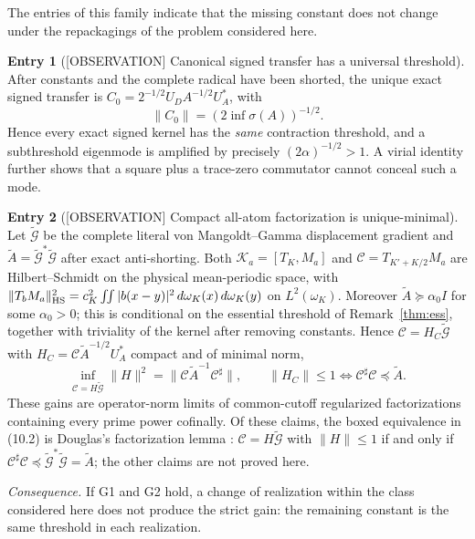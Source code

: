 \documentclass[11pt]{amsart}
\theoremstyle{definition}
\newcounter{family}
\newtheorem{entry}{Entry}[family]
\theoremstyle{remark}
\newcommand{\dd}{\,d}
\newcommand{\OBS}{\textup{[OBSERVATION]}}
\begin{document}
The entries of this family indicate that the missing constant does not
change under the repackagings of the problem considered here.

\begin{entry}[\OBS{} Canonical signed transfer has a universal threshold]
\label{ent:G1}
After constants and the complete radical have been shorted, the unique
exact signed transfer is
\(C_0=2^{-1/2}U_DA^{-1/2}U_A^*\), with
\[
 \boxed{\|C_0\|=(2\inf\sigma(A))^{-1/2}.}
\tag{10.1}
\]
Hence every exact signed kernel has the \emph{same} contraction threshold,
and a subthreshold eigenmode is amplified by precisely
\((2\alpha)^{-1/2}>1\).  A virial identity further shows that a square
plus a trace-zero commutator cannot conceal such a mode.
\end{entry}

\begin{entry}[\OBS{} Compact all-atom factorization is unique-minimal]
\label{ent:G2}
Let \(\widetilde{\mathcal G}\) be the complete literal von
Mangoldt--Gamma displacement gradient and
\(\widetilde A=\widetilde{\mathcal G}^*\widetilde{\mathcal G}\) after exact
anti-shorting.  Both \(\mathcal K_a=[T_K,M_a]\) and
\(\mathcal C=T_{K'+K/2}M_a\) are Hilbert--Schmidt on the physical
mean-periodic space, with
\(\|T_bM_a\|_{\rm HS}^2=c_K^2\iint|b(x-y)|^2\dd\omega_K(x)\dd\omega_K(y)\) on \(L^2(\omega_K)\).
Moreover \(\widetilde A\succeq\alpha_0I\) for some \(\alpha_0>0\); this
is conditional on the essential threshold of Remark~\ref{thm:ess},
together with triviality of the kernel after removing constants.  Hence \(\mathcal C=H_C\widetilde{\mathcal G}\) with
\(H_C=\mathcal C\widetilde A^{-1/2}U_A^*\) compact and of minimal norm,
\[
 \inf_{\mathcal C=H\widetilde{\mathcal G}}\|H\|^2
 =\|\mathcal C\widetilde A^{-1}\mathcal C^\sharp\|,
 \qquad
 \boxed{\|H_C\|\le1\iff\mathcal C^\sharp\mathcal C\preceq\widetilde A .}
\tag{10.2}
\]
These gains are operator-norm limits of common-cutoff regularized
factorizations containing every prime power cofinally.  Of these claims,
the boxed equivalence in (10.2) is Douglas's factorization lemma
\cite{Douglas}: \(\mathcal C=H\widetilde{\mathcal G}\) with \(\|H\|\le1\)
if and only if
\(\mathcal C^\sharp\mathcal C\preceq\widetilde{\mathcal G}^*\widetilde{\mathcal G}=\widetilde A\);
the other claims are not proved here.
\end{entry}

\emph{Consequence.} If G1 and G2 hold, a change of realization within
the class considered here does not produce the strict gain: the
remaining constant is the same threshold in each realization.
\end{document}
